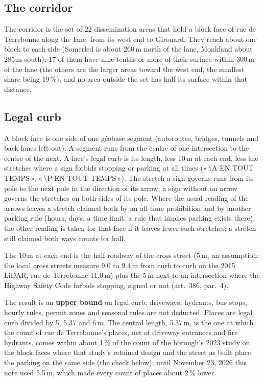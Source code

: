 \documentclass[11pt,a4paper]{article}
\begin{document}
\subsection{The corridor}
The corridor is the set of 22 dissemination areas that hold a block face of rue de Terrebonne along the lane, from its west end to Girouard. They reach about one block to each side (Somerled is about 260\,m north of the lane, Monkland about 285\,m south); 17 of them have nine-tenths or more of their surface within 300\,m of the lane (the others are the larger areas toward the west end, the smallest share being 19\,\%), and no area outside the set has half its surface within that distance.

\subsection{Legal curb}
A block face is one side of one géobase segment (autoroutes, bridges, tunnels and back lanes left out). A segment runs from the centre of one intersection to the centre of the next. A face\textquoteright{}s legal curb is its length, less 10\,m at each end, less the stretches where a sign forbids stopping or parking at all times («\,\textbackslash A EN TOUT TEMPS\,», «\,\textbackslash P EN TOUT TEMPS\,»). The stretch a sign governs runs from its pole to the next pole in the direction of its arrow; a sign without an arrow governs the stretches on both sides of its pole. Where the usual reading of the arrows leaves a stretch claimed both by an all-time prohibition and by another parking rule (hours, days, a time limit: a rule that implies parking exists there), the other reading is taken for that face if it leaves fewer such stretches; a stretch still claimed both ways counts for half.

The 10\,m at each end is the half roadway of the cross street (5\,m, an assumption: the local cross streets measure 9.0 to 9.4\,m from curb to curb on the 2015 LiDAR, rue de Terrebonne 11.0\,m) plus the 5\,m next to an intersection where the Highway Safety Code forbids stopping, signed or not (art.~386, par.~4).

The result is an \textbf{upper bound} on legal curb: driveways, hydrants, bus stops, hourly rules, permit zones and seasonal rules are not deducted. Places are legal curb divided by 5, 5.37 and 6\,m. The central length, 5.37\,m, is the one at which the count of rue de Terrebonne\textquoteright{}s places, net of driveway entrances and fire hydrants, comes within about 1\,\% of the count of the borough\textquoteright{}s 2023 study on the block faces where that study\textquoteright{}s retained design and the street as built place the parking on the same side (the check below); until November 23, 2026 this note used 5.5\,m, which made every count of places about 2\,\% lower.
\end{document}
